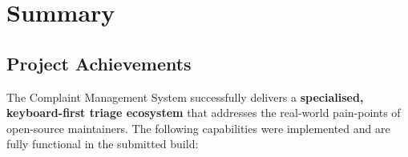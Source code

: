 \documentclass[12pt,a4paper]{report}
\begin{document}
\chapter{Summary}

\section{Project Achievements}

The Complaint Management System successfully delivers a \textbf{specialised,
keyboard-first triage ecosystem} that addresses the real-world pain-points of
open-source maintainers.  The following capabilities were implemented and are
fully functional in the submitted build:
\end{document}
